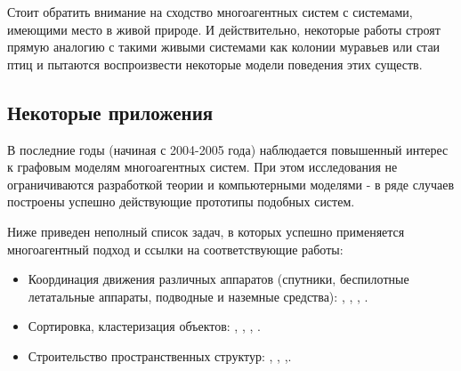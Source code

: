 Стоит обратить внимание на сходство многоагентных систем с системами, имеющими место в живой природе. И действительно, некоторые работы строят прямую аналогию с  такими живыми системами как колонии муравьев или стаи птиц и пытаются воспроизвести некоторые модели поведения этих существ.

\subsection*{Некоторые приложения}

В последние годы (начиная с 2004-2005 года) наблюдается
повышенный интерес к графовым моделям многоагентных систем. При этом исследования
не ограничиваются разработкой теории и компьютерными
моделями - в ряде случаев построены успешно
действующие прототипы подобных систем. 

Ниже приведен неполный список задач, в которых успешно  применяется многоагентный подход и ссылки на соответствующие работы:
\begin{itemize}
\item Координация движения различных аппаратов (спутники, беспилотные летатальные аппараты, подводные и наземные средства): \cite{lafferriere2005decentralized}, \cite{2005flocks}, \cite{vasarhelyi2014outdoor}, \cite{williams2005stable}.
\item Сортировка, кластеризация объектов: \cite{deneubourg1991dynamics}, \cite{ding2014sorting}, \cite{kabla2012collective}, \cite{santos2014segregation}.
\item Строительство пространственных структур: \cite{pennisi2014cooperative}, \cite{petersen2014collective}, \cite{augugliaro2013building},\cite{lindsey2011construction}.
\end{itemize}

\clearpage